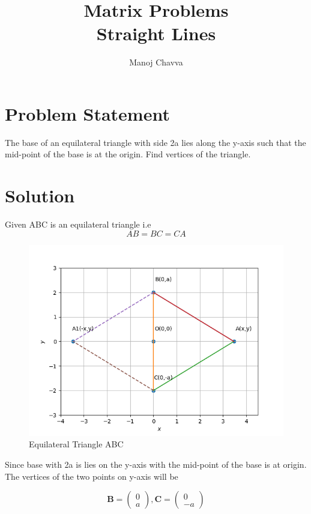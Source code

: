 \documentclass[journal,12pt,twocolumn]{IEEEtran}
\title{Matrix Problems \textbf{\\Straight Lines }}
\author{Manoj Chavva}
\let\vec\mathbf
\begin{document}
\maketitle



\section{Problem Statement}

\noindent The base of an equilateral triangle with side 2a lies along the y-axis such that the mid-point of the base is at the origin. Find vertices of the triangle.


\section{Solution}
\noindent Given ABC is an equilateral triangle i.e 
\begin{equation}
AB = BC = CA  
\end{equation}

\begin{figure}[h]
\includegraphics[width=1\columnwidth]{triangle.png}
\caption{Equilateral Triangle ABC}
\label{fig:triangle}
\end{figure}



\noindent Since base with 2a is lies on the y-axis with the mid-point of the base is at origin. The vertices of the two points on y-axis will be

\begin{equation}
\vec{B}=\begin{pmatrix} 
0\\
a
\end{pmatrix}, {
\vec{C}=\begin{pmatrix} 
0\\
-a
\end{pmatrix} }
\end{equation}
\end{document}
